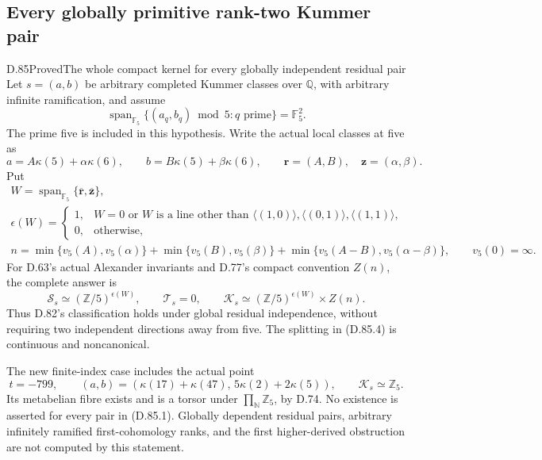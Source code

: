 \subsection{Every globally primitive rank-two Kummer pair}

\begin{statement}{D.85}{Proved}{The whole compact kernel for every globally independent residual pair}
Let \(s=(a,b)\) be arbitrary completed Kummer classes over
\(\mathbb Q\), with arbitrary infinite ramification, and assume
\[
 \operatorname{span}_{\mathbb F_5}
       \{(a_q,b_q)\bmod5:q\text{ prime}\}=\mathbb F_5^2.
                                                               \tag{D.85.1}
\]
The prime five is included in this hypothesis. Write the actual
local classes at five as
\[
 a=A\kappa(5)+\alpha\kappa(6),\qquad
 b=B\kappa(5)+\beta\kappa(6),
 \qquad \mathbf r=(A,B),\quad\mathbf z=(\alpha,\beta).
                                                               \tag{D.85.2}
\]
Put
\[
 \begin{gathered}
 W=\operatorname{span}_{\mathbb F_5}\{\overline{\mathbf r},
                                      \overline{\mathbf z}\},\\
 \epsilon(W)=
 \begin{cases}
 1,&W=0\text{ or }W\text{ is a line other than }
 \langle(1,0)\rangle,\langle(0,1)\rangle,\langle(1,1)\rangle,\\
 0,&\text{otherwise},
 \end{cases}\\
 n=\min\{v_5(A),v_5(\alpha)\}
  +\min\{v_5(B),v_5(\beta)\}
  +\min\{v_5(A-B),v_5(\alpha-\beta)\},\qquad v_5(0)=\infty.
 \end{gathered}                                                \tag{D.85.3}
\]
For D.63's actual Alexander invariants and D.77's compact
convention \(Z(n)\), the complete answer is
\[
 \mathcal S_s\simeq(\mathbb Z/5)^{\epsilon(W)},\qquad
 \mathcal T_s=0,\qquad
 \mathcal K_s\simeq(\mathbb Z/5)^{\epsilon(W)}\times Z(n).
                                                               \tag{D.85.4}
\]
Thus D.82's classification holds under global residual
independence, without requiring two independent directions
away from five. The splitting in (D.85.4) is continuous and
noncanonical.

The new finite-index case includes the actual point
\[
 t=-799,\qquad
 (a,b)=(\kappa(17)+\kappa(47),\,5\kappa(2)+2\kappa(5)),
 \qquad \mathcal K_s\simeq\mathbb Z_5.
                                                               \tag{D.85.5}
\]
Its metabelian fibre exists and is a torsor under
\(\prod_{\mathbb N}\mathbb Z_5\), by D.74. No existence is
asserted for every pair in (D.85.1). Globally dependent
residual pairs, arbitrary infinitely ramified first-cohomology
ranks, and the first higher-derived obstruction are not
computed by this statement.
\end{statement}

